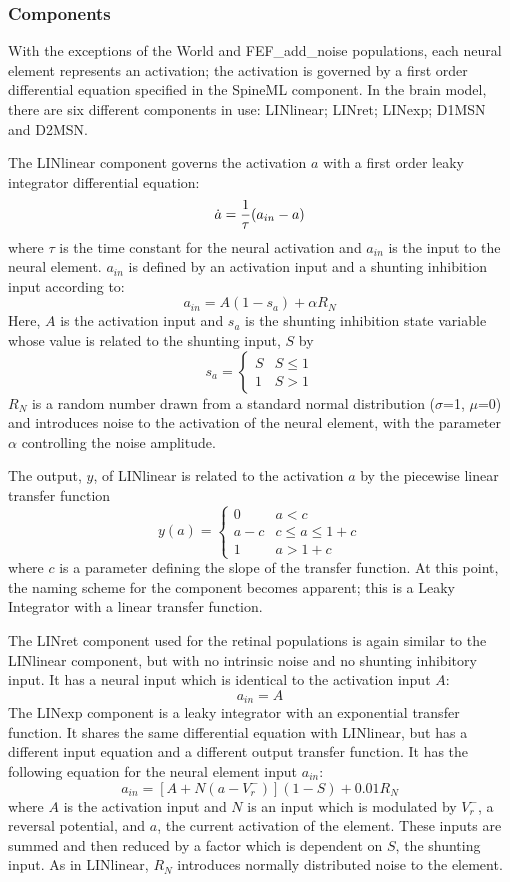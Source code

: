 \documentclass{frontiersSCNS}
\begin{document}
\subsubsection{Components}

With the exceptions of the World and FEF\_add\_noise populations, each
neural element represents an activation; the activation is governed by
a first order differential equation specified in the SpineML
component. In the brain model, there are six different components in
use: LINlinear; LINret; LINexp; D1MSN and D2MSN.

The LINlinear component governs the activation $a$ with a first order
leaky integrator differential equation:
\[
   \dot{a} = {1 \over \tau}(a_{in}-a)
\]
where $\tau$ is the time constant for the neural activation and
$a_{in}$ is the input to the neural element. $a_{in}$ is defined by an
activation input and a shunting inhibition input according to:
\[
   a_{in} = A(1-s_a)+\alpha R_N
\]
Here, $A$ is the activation input and $s_a$ is the shunting inhibition
state variable whose value is related to the shunting input, $S$ by
\[
   s_a = \begin{cases}
      S & S\leq 1 \\
      1 & S > 1
   \end{cases}
\]
$R_N$ is a random number drawn from a standard normal distribution
($\sigma$=1, $\mu$=0) and introduces noise to the activation of the
neural element, with the parameter $\alpha$ controlling the noise
amplitude.

The output, $y$, of LINlinear is related to the activation $a$ by the
piecewise linear transfer function
\[
   y(a) = \begin{cases}
      0   & a < c \\
      a-c & c \leq a \leq 1+c \\
      1   & a > 1+c
   \end{cases}
\]
where $c$ is a parameter defining the slope of the transfer
function. At this point, the naming scheme for the component becomes
apparent; this is a Leaky Integrator with a linear transfer function.

The LINret component used for the retinal populations is again similar
to the LINlinear component, but with no intrinsic noise and no
shunting inhibitory input. It has a neural input which is identical to
the activation input $A$:
\[
   a_{in} = A
\]
The LINexp component is a leaky integrator with an exponential
transfer function. It shares the same differential equation with
LINlinear, but has a different input equation and a different output
transfer function. It has the following equation for the neural
element input $a_{in}$:
\[
   a_{in} = [A+N(a-V_{r}^{-})] (1-S) + 0.01 R_N
\]
where $A$ is the activation input and $N$ is an input which is
modulated by $V_{r}^{-}$, a reversal potential, and $a$, the current
activation of the element. These inputs are summed and then reduced by
a factor which is dependent on $S$, the shunting input. As in
LINlinear, $R_N$ introduces normally distributed noise to the element.
\end{document}
